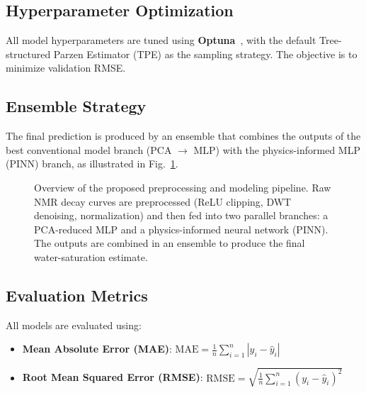 \documentclass[runningheads]{llncs}
\begin{document}
\subsection{Hyperparameter Optimization}
\label{sec:optim}

All model hyperparameters are tuned using \textbf{Optuna}~\cite{ref_optuna}, with the default
Tree-structured Parzen Estimator (TPE) as the sampling strategy. The objective is to minimize
validation RMSE.

\subsection{Ensemble Strategy}
\label{sec:ensemble}

The final prediction is produced by an ensemble that combines the outputs of the best conventional
model branch (PCA $\rightarrow$ MLP) with the physics-informed MLP (PINN) branch, as illustrated
in Fig.~\ref{fig:pipeline}.

\begin{figure}[t]
  \centering
  \caption{Overview of the proposed preprocessing and modeling pipeline. Raw NMR decay curves
  are preprocessed (ReLU clipping, DWT denoising, normalization) and then fed into two parallel
  branches: a PCA-reduced MLP and a physics-informed neural network (PINN). The outputs are
  combined in an ensemble to produce the final water-saturation estimate.}
  \label{fig:pipeline}
\end{figure}

\subsection{Evaluation Metrics}
\label{sec:metrics}

All models are evaluated using:
\begin{itemize}
  \item \textbf{Mean Absolute Error (MAE)}: $\text{MAE} = \frac{1}{n}\sum_{i=1}^{n}|y_i - \hat{y}_i|$
  \item \textbf{Root Mean Squared Error (RMSE)}: $\text{RMSE} = \sqrt{\frac{1}{n}\sum_{i=1}^{n}(y_i - \hat{y}_i)^2}$
\end{itemize}
\end{document}
